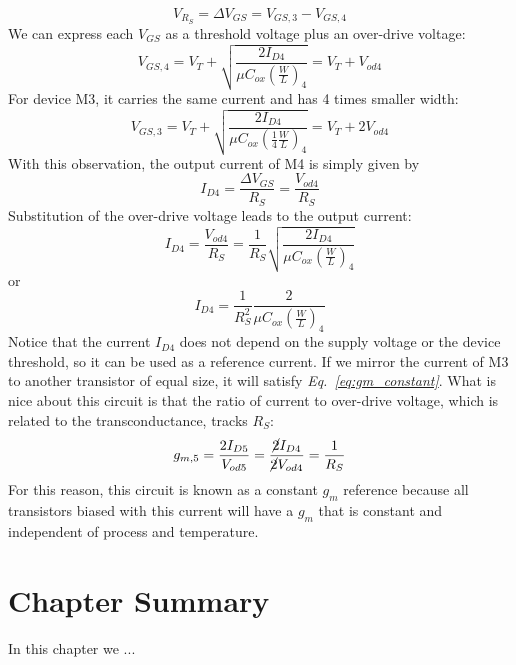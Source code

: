     \begin{equation}
        V_{R_S} = \Delta V_{GS} = V_{GS,3} - V_{GS,4}
    \end{equation}
We can express each $V_{GS}$ as a threshold voltage plus an over-drive voltage:
    \begin{equation}
        V_{GS,4} = V_T + \sqrt{\frac{2 I_{D4}}{\mu C_{ox} \left( \frac{W}{L} \right)_4}} = V_T + V_{od4}
    \end{equation}
For device M3, it carries the same current and has 4 times smaller width:
    \begin{equation}
        V_{GS,3} = V_T + \sqrt{\frac{2 I_{D4}}{\mu C_{ox} \left( \frac{1}{4} \frac{W}{L} \right)_4}} = V_T + 2V_{od4}
    \end{equation}
With this observation, the output current of M4 is simply given by
    \begin{equation}
        I_{D4} = \frac{\Delta V_{GS}}{R_S} = \frac{V_{od4}}{R_S}  \label{eq:gm_constant}
    \end{equation}
Substitution of the over-drive voltage leads to the output current:
    \begin{equation}
        I_{D4} = \frac{V_{od4}}{R_S} = \frac{1}{R_S} \sqrt{\frac{2 I_{D4}}{\mu C_{ox} \left( \frac{W}{L} \right)_4}}
    \end{equation}
or
    \begin{equation}
        I_{D4} = \frac{1}{R_S^2} \frac{2}{\mu C_{ox} \left( \frac{W}{L} \right)_4}
    \end{equation}	
Notice that the current $I_{D4}$ does not depend on the supply voltage or the device threshold, so it can be used as a reference current.  If we mirror the current of M3 to another transistor of equal size, it will satisfy \emph{Eq.~\ref{eq:gm_constant}}.  What is nice about this circuit is that the ratio of current to over-drive voltage, which is related to the transconductance, tracks $R_S$:
    \begin{equation}
        g_{m,5} = \frac{2 I_{D5}}{V_{od5}} = \frac{\cancel{2} I_{D4}}{\cancel{2} V_{od4}} = \frac{1}{R_S} 
    \end{equation}
For this reason, this circuit is known as a constant $g_m$ reference because all transistors biased with this current will have a $g_m$ that is constant and independent of process and temperature.
\newpage
\section{Chapter Summary}
In this chapter we ...

